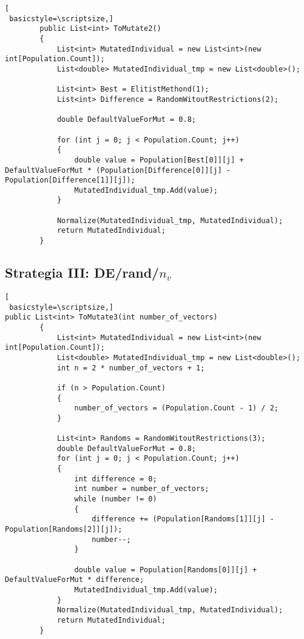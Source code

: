\begin{lstlisting}[
 basicstyle=\scriptsize,]
        public List<int> ToMutate2()
        {
            List<int> MutatedIndividual = new List<int>(new int[Population.Count]);
            List<double> MutatedIndividual_tmp = new List<double>();

            List<int> Best = ElitistMethond(1);
            List<int> Difference = RandomWitoutRestrictions(2);

            double DefaultValueForMut = 0.8;

            for (int j = 0; j < Population.Count; j++)
            {
                double value = Population[Best[0]][j] + DefaultValueForMut * (Population[Difference[0]][j] - Population[Difference[1]][j]);
                MutatedIndividual_tmp.Add(value);
            }

            Normalize(MutatedIndividual_tmp, MutatedIndividual);
            return MutatedIndividual;
        }
\end{lstlisting}

\subsection*{Strategia III: DE/rand/$n_{v}$}

\begin{lstlisting}[
 basicstyle=\scriptsize,]
public List<int> ToMutate3(int number_of_vectors)
        {
            List<int> MutatedIndividual = new List<int>(new int[Population.Count]);
            List<double> MutatedIndividual_tmp = new List<double>();
            int n = 2 * number_of_vectors + 1;

            if (n > Population.Count)
            {
                number_of_vectors = (Population.Count - 1) / 2;
            }

            List<int> Randoms = RandomWitoutRestrictions(3);
            double DefaultValueForMut = 0.8;
            for (int j = 0; j < Population.Count; j++)
            {
                int difference = 0;
                int number = number_of_vectors;
                while (number != 0)
                {
                    difference += (Population[Randoms[1]][j] - Population[Randoms[2]][j]);
                    number--;
                }

                double value = Population[Randoms[0]][j] + DefaultValueForMut * difference;
                MutatedIndividual_tmp.Add(value);
            }
            Normalize(MutatedIndividual_tmp, MutatedIndividual);
            return MutatedIndividual;
        }
\end{lstlisting}

